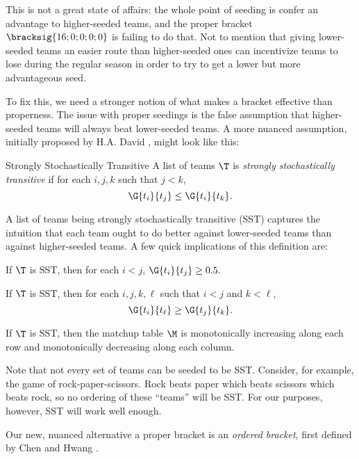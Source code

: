 {This is not a great state of affairs: the whole point of seeding is confer an advantage to higher-seeded teams, and the proper bracket $\bracksig{16; 0; 0; 0; 0}$ is failing to do that. Not to mention that giving lower-seeded teams an easier route than higher-seeded ones can incentivize teams to lose during the regular season in order to try to get a lower but more advantageous seed.

To fix this, we need a stronger notion of what makes a bracket effective than properness. The issue with proper seedings is the false assumption that higher-seeded teams will always beat lower-seeded teams. A more nuanced assumption, initially proposed by H.A. David \cite{stochastic}, might look like this:

\begin{definition}{Strongly Stochastically Transitive}{}
    A list of teams $\T$ is \textit{strongly stochastically transitive} if for each $i, j, k$ such that $j < k$, $$\G{t_i}{t_j} \leq \G{t_i}{t_k}.$$
\end{definition}

A list of teams being strongly stochastically transitive (SST) captures the intuition that each team ought to do better against lower-seeded teams than against higher-seeded teams. A few quick implications of this definition are:

\begin{corollary}{}{}
    If $\T$ is SST, then for each $i < j$, $\G{t_i}{t_j} \geq 0.5.$
\end{corollary}

\begin{corollary}{}{}
    If $\T$ is SST, then for each $i, j, k, \ell$ such that $i < j$ and $k < \ell$, $$\G{t_i}{t_\ell} \geq \G{t_j}{t_k}.$$
\end{corollary}

\begin{corollary}{}{}
    If $\T$ is SST, then the matchup table $\M$ is monotonically increasing along each row and monotonically decreasing along each column.
\end{corollary}

Note that not every set of teams can be seeded to be SST. Consider, for example, the game of rock-paper-scissors. Rock beats paper which beats scissors which beats rock, so no ordering of these ``teams'' will be SST. For our purposes, however, SST will work well enough.

Our new, nuanced alternative a proper bracket is an \textit{ordered bracket}, first defined by Chen and Hwang \cite{define_ordered}.

}
